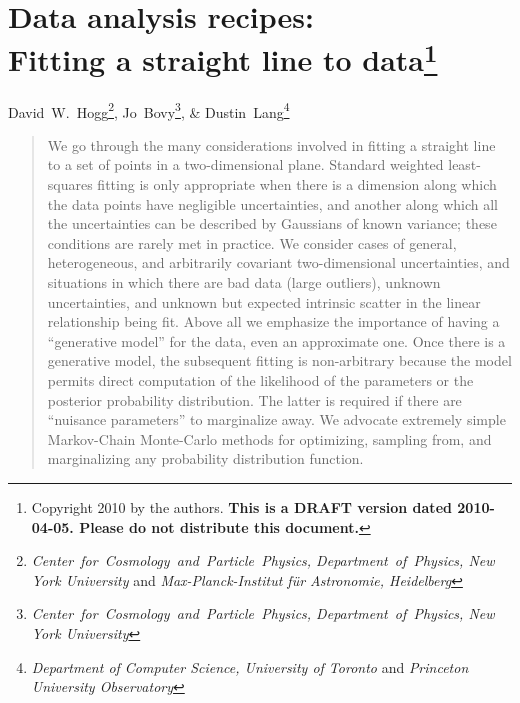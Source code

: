 \documentclass[12pt,twoside]{article}
\begin{document}
\thispagestyle{plain}\raggedbottom
\section*{Data analysis recipes:\ \\
  Fitting a straight line to data\footnote{
    Copyright 2010 by the authors.
    \textbf{This is a DRAFT version dated 2010-04-05.
    Please do not distribute this document.}}}

\noindent
David~W.~Hogg\footnote{\textsl{Center~for~Cosmology~and~Particle~Physics, Department~of~Physics, New York University} and \textsl{Max-Planck-Institut f\"ur Astronomie, Heidelberg}},
Jo~Bovy\footnote{\textsl{Center~for~Cosmology~and~Particle~Physics, Department~of~Physics, New York University}}, \&
Dustin~Lang\footnote{\textsl{Department of Computer Science, University of Toronto} and \textsl{Princeton University Observatory}}

\begin{abstract}
  We go through the many considerations involved in fitting a straight
  line to a set of points in a two-dimensional plane.  Standard
  weighted least-squares fitting is only appropriate when there is a
  dimension along which the data points have negligible uncertainties,
  and another along which all the uncertainties can be described by
  Gaussians of known variance; these conditions are rarely met in
  practice.  We consider cases of general, heterogeneous, and
  arbitrarily covariant two-dimensional uncertainties, and situations
  in which there are bad data (large outliers), unknown uncertainties,
  and unknown but expected intrinsic scatter in the linear
  relationship being fit.  Above all we emphasize the importance of
  having a ``generative model'' for the data, even an approximate one.
  Once there is a generative model, the subsequent fitting is
  non-arbitrary because the model permits direct computation of the
  likelihood of the parameters or the posterior probability
  distribution.  The latter is required if there are ``nuisance
  parameters'' to marginalize away.  We advocate extremely simple
  Markov-Chain Monte-Carlo methods for optimizing, sampling from, and
  marginalizing any probability distribution function.
\end{abstract}
\end{document}
